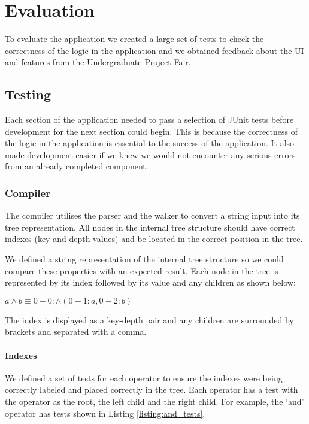 \documentclass[draft]{report}
\begin{document}
\chapter{Evaluation}

To evaluate the application we created a large set of tests to check the correctness of the logic in the application and we obtained feedback about the UI and features from the Undergraduate Project Fair.

\section{Testing}

Each section of the application needed to pass a selection of JUnit tests before development for the next section could begin. This is because the correctness of the logic in the application is essential to the success of the application. It also made development easier if we knew we would not encounter any serious errors from an already completed component.

\subsection{Compiler}

The compiler utilises the parser and the walker to convert a string input into its tree representation. All nodes in the internal tree structure should have correct indexes (key and depth values) and be located in the correct position in the tree.

We defined a string representation of the internal tree structure so we could compare these properties with an expected result. Each node in the tree is represented by its index followed by its value and any children as shown below:

\begin{center}
$a\land b \equiv 0-0: \land (0-1: a, 0-2: b)$
\end{center}

The index is displayed as a key-depth pair and any children are surrounded by brackets and separated with a comma.

\subsubsection{Indexes}

We defined a set of tests for each operator to ensure the indexes were being correctly labeled and placed correctly in the tree. Each operator has a test with the operator as the root, the left child and the right child. For example, the `and' operator has tests shown in Listing \ref{listing:and_tests}.
\end{document}
